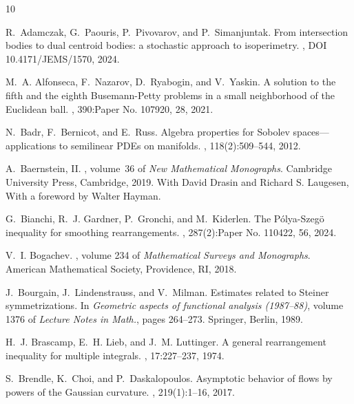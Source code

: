 \documentclass[11pt]{article}
\theoremstyle{definition}
\theoremstyle{proof}
\DeclareMathOperator{\+}{\mathop{\tilde{+}}}
\numberwithin{equation}{section}
\numberwithin{equation}{section}
\begin{document}


\def\cprime{$'$} \def\textasciitilde{$\sim$}
\begin{thebibliography}{10}

R.~Adamczak, G.~Paouris, P.~Pivovarov, and P.~Simanjuntak.
\newblock From intersection bodies to dual centroid bodies: a stochastic
  approach to isoperimetry.
, DOI 10.4171/JEMS/1570, 2024.

M.~A. Alfonseca, F.~Nazarov, D.~Ryabogin, and V.~Yaskin.
\newblock A solution to the fifth and the eighth {B}usemann-{P}etty problems in
  a small neighborhood of the {E}uclidean ball.
, 390:Paper No. 107920, 28, 2021.

N.~Badr, F.~Bernicot, and E.~Russ.
\newblock Algebra properties for {S}obolev spaces---applications to semilinear
  {PDE}s on manifolds.
, 118(2):509--544, 2012.

A.~Baernstein, II.
, volume~36 of {\em New Mathematical
  Monographs}.
\newblock Cambridge University Press, Cambridge, 2019.
\newblock With David Drasin and Richard S. Laugesen, With a foreword by Walter
  Hayman.

G.~Bianchi, R.~J. Gardner, P.~Gronchi, and M.~Kiderlen.
\newblock The {P}\'{o}lya-{S}zeg\"{o} inequality for smoothing rearrangements.
, 287(2):Paper No. 110422, 56, 2024.

V.~I. Bogachev.
, volume 234 of {\em Mathematical
  Surveys and Monographs}.
\newblock American Mathematical Society, Providence, RI, 2018.

J.~Bourgain, J.~Lindenstrauss, and V.~Milman.
\newblock Estimates related to {S}teiner symmetrizations.
\newblock In {\em Geometric aspects of functional analysis (1987--88)}, volume
  1376 of {\em Lecture Notes in Math.}, pages 264--273. Springer, Berlin, 1989.

H.~J. Brascamp, E.~H. Lieb, and J.~M. Luttinger.
\newblock A general rearrangement inequality for multiple integrals.
, 17:227--237, 1974.

S.~Brendle, K.~Choi, and P.~Daskalopoulos.
\newblock Asymptotic behavior of flows by powers of the {G}aussian curvature.
, 219(1):1--16, 2017.


\end{thebibliography}
\end{document}
